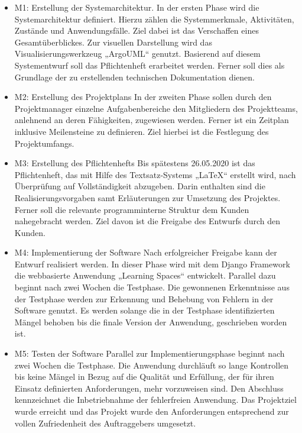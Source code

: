 \documentclass[a4paper,report,headsepline]{scrreprt}
\begin{document}
\begin{itemize} 
\item M1: Erstellung der Systemarchitektur. 
In der ersten Phase wird die Systemarchitektur definiert. Hierzu zählen die Systemmerkmale, Aktivitäten, Zustände und Anwendungsfälle. Ziel dabei ist das Verschaffen eines Gesamtüberblickes. Zur visuellen Darstellung wird das Visualisierungswerkzeug „ArgoUML“ genutzt. Basierend auf diesem Systementwurf soll das Pflichtenheft erarbeitet werden. Ferner soll dies als Grundlage der zu erstellenden technischen Dokumentation dienen.

\item M2: Erstellung des Projektplans
In der zweiten Phase sollen durch den Projektmanager einzelne Aufgabenbereiche den Mitgliedern des Projektteams, anlehnend an deren Fähigkeiten, zugewiesen werden. Ferner ist ein Zeitplan inklusive Meilensteine zu definieren. Ziel hierbei ist die Festlegung des Projektumfangs.

\item M3: Erstellung des Pflichtenhefts
Bis spätestens 26.05.2020 ist das Pflichtenheft, das mit Hilfe des Textsatz-Systems „LaTeX“ erstellt wird, nach Überprüfung auf Vollständigkeit abzugeben. Darin enthalten sind die Realisierungsvorgaben samt Erläuterungen zur Umsetzung des Projektes. Ferner soll die relevante programminterne Struktur dem Kunden nahegebracht werden. Ziel davon ist die Freigabe des Entwurfs durch den Kunden.

\item M4: Implementierung der Software 
Nach erfolgreicher Freigabe kann der Entwurf realisiert werden. In dieser Phase wird mit dem Django Framework die webbasierte Anwendung „Learning Spaces“ entwickelt. Parallel dazu beginnt nach zwei Wochen die Testphase. Die gewonnenen Erkenntnisse aus der Testphase werden zur Erkennung und Behebung von Fehlern in der Software genutzt. Es werden solange die in der Testphase identifizierten Mängel behoben bis die finale Version der Anwendung, geschrieben worden ist. 

\item M5: Testen der Software
Parallel zur Implementierungsphase beginnt nach zwei Wochen die Testphase. Die Anwendung durchläuft so lange Kontrollen bis keine Mängel in Bezug auf die Qualität und Erfüllung, der für ihren Einsatz definierten Anforderungen, mehr vorzuweisen sind. Den Abschluss kennzeichnet die Inbetriebnahme der fehlerfreien Anwendung. Das Projektziel wurde  erreicht  und  das  Projekt  wurde  den Anforderungen entsprechend zur vollen Zufriedenheit des Auftraggebers umgesetzt.


\end{itemize}
\end{document}
